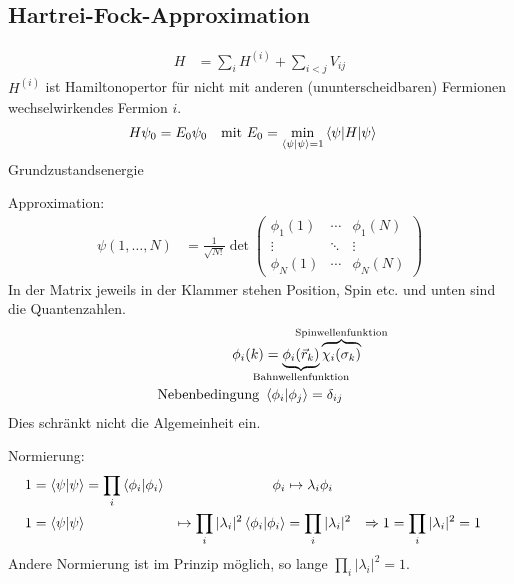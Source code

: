 \subsection{Hartrei-Fock-Approximation}
	\begin{align*}
		H &= \sum_i H^{(i)} + \sum_{i<j} V_{ij}
	\end{align*}
$H^{(i)}$ ist Hamiltonopertor für nicht mit anderen (ununterscheidbaren) Fermionen wechselwirkendes Fermion $i$.
	\begin{align*}
		H \psi_0 &= E_0 \psi_0 
		&\text{mit } E_0 &= \underset{\braket{\psi | \psi} = 1}{\mathrm{min}} \braket{\psi | H | \psi}
	\end{align*}
Grundzustandsenergie

Approximation:
	\begin{align*}
		\psi (1, \ldots, N) 
		&= \frac{1}{\sqrt{N!}} \det 
		\begin{pmatrix}
		\phi_{1}(1) & \cdots & \phi_{1}(N) \\
		\vdots & \ddots & \vdots\\
		\phi_{N}(1) & \cdots & \phi_{N}(N)
		\end{pmatrix} 
	\end{align*}
In der Matrix jeweils in der Klammer stehen Position, Spin etc. und unten sind die Quantenzahlen.
	\begin{align*}
		\phi_i (k) &=
		\underbrace{\phi_i (\vec{r}_k)}_{\mathclap{\text{Bahnwellenfunktion}}}
		\overbrace{\chi_i (\sigma_k)}^{\mathclap{\text{Spinwellenfunktion}}} \\
		\text{Nebenbedingung } &\braket{\phi_i | \phi_j} = \delta_{ij}
	\end{align*}
Dies schränkt nicht die Algemeinheit ein.

Normierung:
	\begin{align*}
		1 &= \braket{\psi | \psi} = \prod_i \braket{\phi_i | \phi_i} 
		& \phi_i &\mapsto \lambda_i \phi_i \\
		1 &= \braket{\psi | \psi} 
		&\mapsto \prod_i |\lambda_i|^2 \braket{\phi_i | \phi_i} &= \prod_i |\lambda_i|^2
		&\Rightarrow 1 &= \prod_i |\lambda_i|^2 = 1 
	\end{align*}
Andere Normierung ist im Prinzip möglich, so lange $\prod_i |\lambda_i|^2 = 1$.

